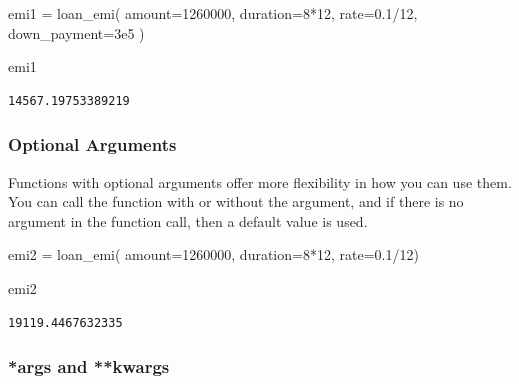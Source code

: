 \documentclass[
  letterpaper,
  DIV=11,
  numbers=noendperiod]{scrreprt}
\newenvironment{Shaded}{\begin{snugshade}}{\end{snugshade}}
\newcommand{\DecValTok}[1]{\textcolor[rgb]{0.68,0.00,0.00}{#1}}
\newcommand{\FloatTok}[1]{\textcolor[rgb]{0.68,0.00,0.00}{#1}}
\newcommand{\NormalTok}[1]{\textcolor[rgb]{0.00,0.23,0.31}{#1}}
\newcommand{\OperatorTok}[1]{\textcolor[rgb]{0.37,0.37,0.37}{#1}}
\begin{document}
\begin{Shaded}
\begin{Highlighting}[]
\NormalTok{emi1 }\OperatorTok{=}\NormalTok{ loan\_emi(}
\NormalTok{    amount}\OperatorTok{=}\DecValTok{1260000}\NormalTok{, }
\NormalTok{    duration}\OperatorTok{=}\DecValTok{8}\OperatorTok{*}\DecValTok{12}\NormalTok{, }
\NormalTok{    rate}\OperatorTok{=}\FloatTok{0.1}\OperatorTok{/}\DecValTok{12}\NormalTok{, }
\NormalTok{    down\_payment}\OperatorTok{=}\FloatTok{3e5}
\NormalTok{)}
\end{Highlighting}
\end{Shaded}

\begin{Shaded}
\begin{Highlighting}[]
\NormalTok{emi1}
\end{Highlighting}
\end{Shaded}

\begin{verbatim}
14567.19753389219
\end{verbatim}

\hypertarget{optional-arguments}{%
\subsubsection{Optional Arguments}\label{optional-arguments}}

Functions with optional arguments offer more flexibility in how you can
use them. You can call the function with or without the argument, and if
there is no argument in the function call, then a default value is used.

\begin{Shaded}
\begin{Highlighting}[]
\NormalTok{emi2 }\OperatorTok{=}\NormalTok{ loan\_emi(}
\NormalTok{    amount}\OperatorTok{=}\DecValTok{1260000}\NormalTok{, }
\NormalTok{    duration}\OperatorTok{=}\DecValTok{8}\OperatorTok{*}\DecValTok{12}\NormalTok{, }
\NormalTok{    rate}\OperatorTok{=}\FloatTok{0.1}\OperatorTok{/}\DecValTok{12}\NormalTok{)}

\NormalTok{emi2}
\end{Highlighting}
\end{Shaded}

\begin{verbatim}
19119.4467632335
\end{verbatim}

\hypertarget{args-and-kwargs}{%
\subsubsection{*args and **kwargs}\label{args-and-kwargs}}
\end{document}
